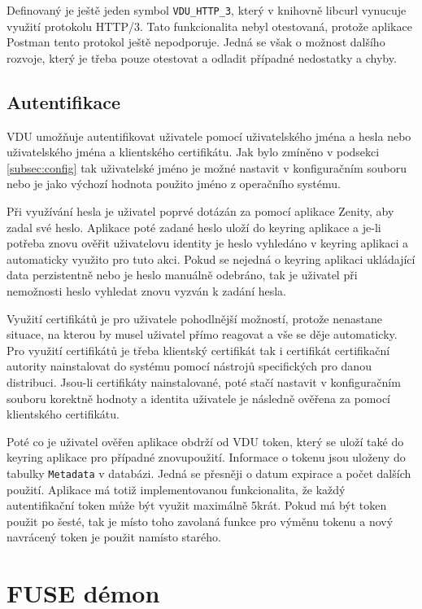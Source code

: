 Definovaný je ještě jeden symbol \texttt{VDU\_HTTP\_3}, který v knihovně libcurl vynucuje využití protokolu HTTP/3. Tato funkcionalita nebyl otestovaná, protože aplikace Postman 
tento protokol ještě nepodporuje. Jedná se však o možnost dalšího rozvoje, který je třeba pouze otestovat a odladit případné nedostatky a chyby.

\subsection{Autentifikace}
\label{subsec:authentication}

VDU umožňuje autentifikovat uživatele pomocí uživatelského jména a hesla nebo uživatelského jména a klientského certifikátu. Jak bylo zmíněno v podsekci \ref{subsec:config}
tak uživatelské jméno je možné nastavit v konfiguračním souboru nebo je jako výchozí hodnota použito jméno z operačního systému.

Při využívání hesla je uživatel poprvé dotázán za pomocí aplikace Zenity, aby zadal své heslo. Aplikace poté zadané heslo uloží do keyring aplikace a je-li potřeba znovu ověřit
uživatelovu identity je heslo vyhledáno v keyring aplikaci a automaticky využito pro tuto akci. Pokud se nejedná o keyring aplikaci ukládající data perzistentně nebo je
heslo manuálně odebráno, tak je uživatel při nemožnosti heslo vyhledat znovu vyzván k zadání hesla.

Využití certifikátů je pro uživatele pohodlnější možností, protože nenastane situace, na kterou by musel uživatel přímo reagovat a vše se děje automaticky. Pro využití
certifikátů je třeba klientský certifikát tak i certifikát certifikační autority nainstalovat do systému pomocí nástrojů specifických pro danou distribuci. Jsou-li certifikáty
nainstalované, poté stačí nastavit v konfiguračním souboru korektně hodnoty a identita uživatele je následně ověřena za pomocí klientského certifikátu.

Poté co je uživatel ověřen aplikace obdrží od VDU token, který se uloží také do keyring aplikace pro případné znovupoužití. Informace o tokenu jsou uloženy do 
tabulky \texttt{Metadata} v databázi. Jedná se přesněji o datum expirace a počet dalších použití. Aplikace má totiž implementovanou funkcionalita, že každý autentifikační token
může být využit maximálně 5krát. Pokud má být token použit po šesté, tak je místo toho zavolaná funkce pro výměnu tokenu a nový navrácený token je použit namísto starého.

\section{FUSE démon}


